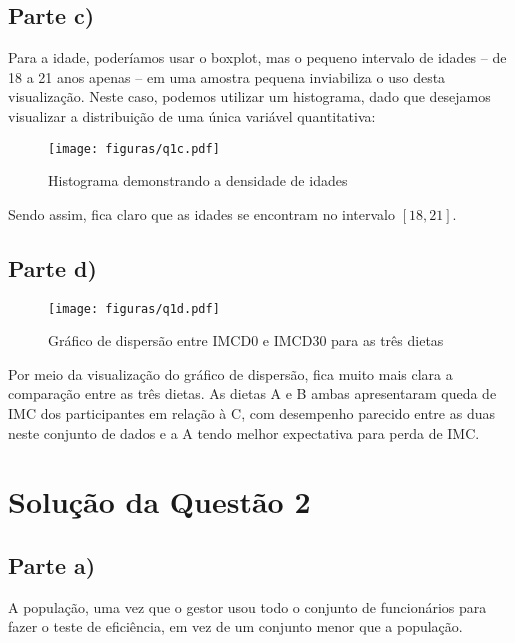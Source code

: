\documentclass[
	12pt,				%
	openright,			%
	twoside,			%
	a4paper,			%
	english,			%
	french,				%
	spanish,			%
	brazil,				%
	]{abntex2}
\begin{document}
\subsection{Parte c)}
Para a idade, poderíamos usar o boxplot, mas o pequeno intervalo de idades -- de 18 a 21 anos apenas -- em uma amostra pequena inviabiliza o uso desta visualização. Neste caso, podemos utilizar um histograma, dado que desejamos visualizar a distribuição de uma única variável quantitativa:
\begin{figure}[H]
	\begin{center}
	    \texttt{[image: figuras/q1c.pdf]}
	\end{center}
\caption{Histograma demonstrando a densidade de idades}
\end{figure}
Sendo assim, fica claro que as idades se encontram no intervalo $[18, 21]$.

\subsection{Parte d)}
\begin{figure}[!htbp]
	\begin{center}
	    \texttt{[image: figuras/q1d.pdf]}
	\end{center}
\caption{Gráfico de dispersão entre IMCD0 e IMCD30 para as três dietas}
\end{figure}

Por meio da visualização do gráfico de dispersão, fica muito mais clara a comparação entre as três dietas. As dietas A e B ambas apresentaram queda de IMC dos participantes em relação à C, com desempenho parecido entre as duas neste conjunto de dados e a A tendo melhor expectativa para perda de IMC.

\section{Solução da Questão 2}
\subsection{Parte a)}
A população, uma vez que o gestor usou todo o conjunto de funcionários para fazer o teste de eficiência, em vez de um conjunto menor que a população.
\end{document}
